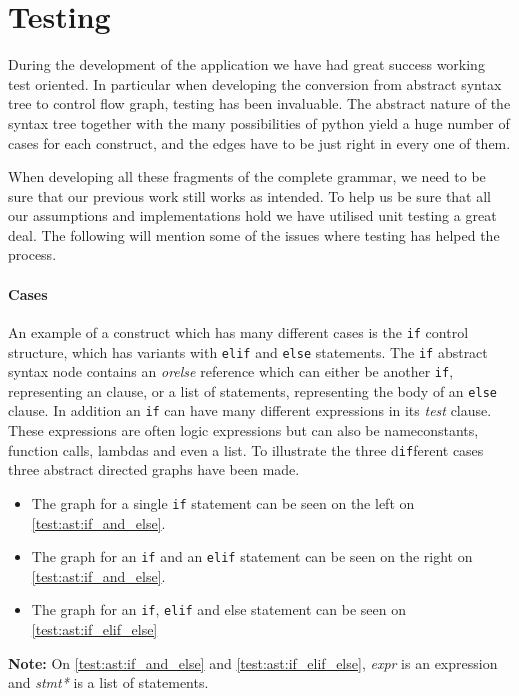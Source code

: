 \section{Testing}
During the development of the application we have had great success working test oriented.
In particular when developing the conversion from abstract syntax tree to control flow graph, testing has been invaluable.
The abstract nature of the syntax tree together with the many possibilities of python yield a huge number of cases for each construct, and the edges have to be just right in every one of them.

When developing all these fragments of the complete grammar, we need to be sure that our previous work still works as intended.
To help us be sure that all our assumptions and implementations hold we have utilised unit testing a great deal.
The following will mention some of the issues where testing has helped the process.

\paragraph{Cases}
An example of a construct which has many different cases is the \texttt{if} control structure, which has variants with \texttt{elif} and \texttt{else} statements.
The \texttt{if} abstract syntax node contains an \emph{orelse} reference which can either be another \texttt{if}, representing an  clause, or a list of statements, representing the body of an \texttt{else} clause.
In addition an \texttt{if} can have many different expressions in its \emph{test} clause.
These expressions are often logic expressions but can also be nameconstants, function calls, lambdas and even a list.
To illustrate the three d\texttt{if}ferent cases three abstract directed graphs have been made.
\begin{itemize}
\item The graph for a single \texttt{if} statement can be seen on the left on \cref{test:ast:if_and_else}.
\item The graph for an \texttt{if} and an \texttt{elif} statement can be seen on the right on \cref{test:ast:if_and_else}.
\item The graph for an \texttt{if}, \texttt{elif} and else statement can be seen on \cref{test:ast:if_elif_else}
\end{itemize}
\textbf{Note:} On \cref{test:ast:if_and_else} and \cref{test:ast:if_elif_else}, \textit{expr} is an expression and \textit{stmt*} is a list of statements.


